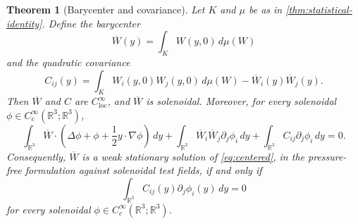 \documentclass[11pt]{amsart}
\theoremstyle{plain}
\newtheorem{theorem}{Theorem}[section]
\theoremstyle{definition}
\theoremstyle{remark}
\numberwithin{equation}{section}
\begin{document}
\begin{theorem}[Barycenter and covariance]\label{thm:barycenter}
Let \(K\) and \(\mu\) be as in \cref{thm:statistical-identity}.  Define the
barycenter
\[
   \overline W(y)=\int_K W(y,0)\,d\mu(W)
\]
and the quadratic covariance
\[
   C_{ij}(y)=
   \int_K W_i(y,0)W_j(y,0)\,d\mu(W)
   -
   \overline W_i(y)\overline W_j(y).
\]
Then \(\overline W\) and \(C\) are \(C^\infty_{\mathrm{loc}}\), and
\(\overline W\) is solenoidal.  Moreover, for every solenoidal
\(\phi\in C_c^\infty(\mathbb R^3;\mathbb R^3)\),
\begin{equation}\label{eq:barycenter-equation}
   \int_{\mathbb R^3}
   \overline W\cdot
   \left(\Delta\phi+\phi+\frac12 y\cdot\nabla\phi\right)\,dy
   +
   \int_{\mathbb R^3}
   \overline W_i\overline W_j\partial_j\phi_i\,dy
   +
   \int_{\mathbb R^3}
   C_{ij}\partial_j\phi_i\,dy
   =0 .
\end{equation}
Consequently, \(\overline W\) is a weak stationary solution of
\eqref{eq:centered}, in the pressure-free formulation against solenoidal
test fields, if and only if
\begin{equation}\label{eq:zero-covariance}
   \int_{\mathbb R^3}C_{ij}(y)\partial_j\phi_i(y)\,dy=0
\end{equation}
for every solenoidal
\(\phi\in C_c^\infty(\mathbb R^3;\mathbb R^3)\).
\end{theorem}
\end{document}

